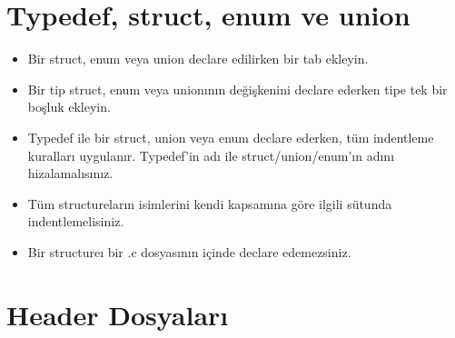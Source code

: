 \documentclass{42-en}
\begin{document}
    \section{Typedef, struct, enum ve union}

        \begin{itemize}

            \item Bir struct, enum veya union declare edilirken bir tab ekleyin.

            \item Bir tip struct, enum veya unionının değişkenini declare ederken tipe tek bir boşluk ekleyin.

            \item Typedef ile bir struct, union veya enum declare ederken, tüm indentleme kuralları uygulanır. Typedef’in adı
ile struct/union/enum’ın adını hizalamalısınız.

            \item Tüm structureların isimlerini kendi kapsamına göre ilgili sütunda indentlemelisiniz.

            \item Bir structureı bir .c dosyasının içinde declare edemezsiniz.

        \end{itemize}
        \newpage


    \section{Header Dosyaları}
\end{document}
